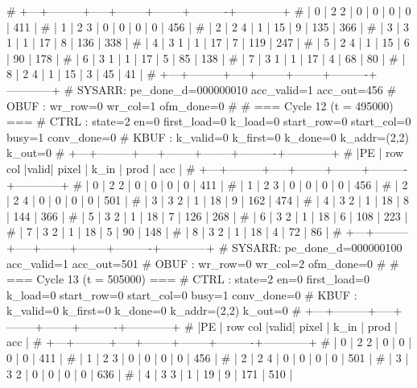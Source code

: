 # +---+---------+-----+--------+--------+----------+------------+
# | 0 |   2   2 |  0  |      0 |      0 |        0 |        411 |
# | 1 |   2   3 |  0  |      0 |      0 |        0 |        456 |
# | 2 |   2   4 |  1  |     15 |      9 |      135 |        366 |
# | 3 |   3   1 |  1  |     17 |      8 |      136 |        338 |
# | 4 |   3   1 |  1  |     17 |      7 |      119 |        247 |
# | 5 |   2   4 |  1  |     15 |      6 |       90 |        178 |
# | 6 |   3   1 |  1  |     17 |      5 |       85 |        138 |
# | 7 |   3   1 |  1  |     17 |      4 |       68 |         80 |
# | 8 |   2   4 |  1  |     15 |      3 |       45 |         41 |
# +---+---------+-----+--------+--------+----------+------------+
# SYSARR: pe_done_d=000000010 acc_valid=1 acc_out=456
# OBUF : wr_row=0 wr_col=1 ofm_done=0
# 
# === Cycle 12  (t = 495000) ===
# CTRL : state=2 en=0 first_load=0 k_load=0 start_row=0 start_col=0 busy=1 conv_done=0
# KBUF : k_valid=0 k_first=0 k_done=0 k_addr=(2,2) k_out=0
# +---+---------+-----+--------+--------+----------+------------+
# |PE | row col |valid| pixel  |  k_in  |   prod   |    acc     |
# +---+---------+-----+--------+--------+----------+------------+
# | 0 |   2   2 |  0  |      0 |      0 |        0 |        411 |
# | 1 |   2   3 |  0  |      0 |      0 |        0 |        456 |
# | 2 |   2   4 |  0  |      0 |      0 |        0 |        501 |
# | 3 |   3   2 |  1  |     18 |      9 |      162 |        474 |
# | 4 |   3   2 |  1  |     18 |      8 |      144 |        366 |
# | 5 |   3   2 |  1  |     18 |      7 |      126 |        268 |
# | 6 |   3   2 |  1  |     18 |      6 |      108 |        223 |
# | 7 |   3   2 |  1  |     18 |      5 |       90 |        148 |
# | 8 |   3   2 |  1  |     18 |      4 |       72 |         86 |
# +---+---------+-----+--------+--------+----------+------------+
# SYSARR: pe_done_d=000000100 acc_valid=1 acc_out=501
# OBUF : wr_row=0 wr_col=2 ofm_done=0
# 
# === Cycle 13  (t = 505000) ===
# CTRL : state=2 en=0 first_load=0 k_load=0 start_row=0 start_col=0 busy=1 conv_done=0
# KBUF : k_valid=0 k_first=0 k_done=0 k_addr=(2,2) k_out=0
# +---+---------+-----+--------+--------+----------+------------+
# |PE | row col |valid| pixel  |  k_in  |   prod   |    acc     |
# +---+---------+-----+--------+--------+----------+------------+
# | 0 |   2   2 |  0  |      0 |      0 |        0 |        411 |
# | 1 |   2   3 |  0  |      0 |      0 |        0 |        456 |
# | 2 |   2   4 |  0  |      0 |      0 |        0 |        501 |
# | 3 |   3   2 |  0  |      0 |      0 |        0 |        636 |
# | 4 |   3   3 |  1  |     19 |      9 |      171 |        510 |
